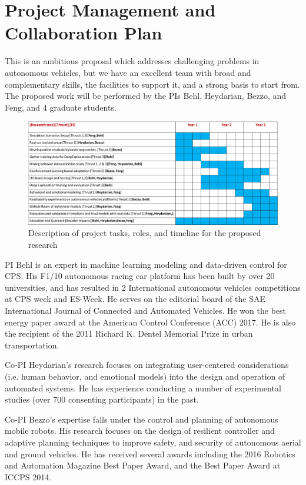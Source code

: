 \section{Project Management and Collaboration Plan}
\label{sec:plan}
This is an ambitious proposal which addresses challenging problems in autonomous vehicles, but we have an excellent team with broad and complementary skills, the facilities to support it, and a strong basis to start from.
The proposed work will be performed by the PIs Behl, Heydarian, Bezzo, and Feng, and 4 graduate students.
\begin{figure}
    \centering
    \includegraphics[width=0.65\columnwidth]{figures/gantt_plan.png}
    \caption{Description of project tasks, roles, and timeline for the proposed research}
    \label{fig:gantt}
\end{figure}

PI Behl is an expert in machine learning modeling and data-driven control for CPS. His F1/10 autonomous racing car platform has been built by over 20 universities, and has resulted in 2 International autonomous vehicles competitions at CPS week and ES-Week. He serves on the editorial board of the SAE International Journal of Connected and Automated Vehicles. He won the best energy paper award at the American Control Conference (ACC) 2017. He is also the recipient of the 2011 Richard K. Dentel Memorial Prize in urban transportation.

Co-PI Heydarian’s research focuses on integrating user-centered considerations (i.e. human behavior, and emotional models) into the design and operation of automated systems. He has experience conducting a number of experimental studies (over 700 consenting participants) in the past.

Co-PI Bezzo's expertise falls under the control and planning of autonomous mobile robots. His research focuses on the design of resilient controller and adaptive planning techniques to improve safety, and security of autonomous aerial and ground vehicles. He has received several awards including the 2016 Robotics and Automation Magazine Best Paper Award, and the Best Paper Award at ICCPS 2014.

